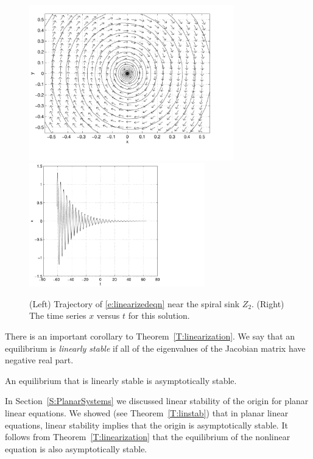 \documentclass{ximera}
\begin{document}
\begin{figure}[htb]
           \centerline{%
	   \includegraphics[width=3.5in]{../figures/spirala.pdf}
           \includegraphics[width=3.0in]{../figures/spiralb.pdf}}
           \caption{(Left) Trajectory of \protect\eqref{e:linearizedeqn} 
	     near the spiral sink $Z_2$. (Right) The time series $x$ 
		versus $t$ for this solution.}
           \label{F:spiral}
\end{figure}


There is an important corollary to Theorem~\ref{T:linearization}.
We say that an equilibrium is 
{\em linearly stable\/}
if all of the eigenvalues of the Jacobian matrix have negative real part.

\begin{corollary} \label{C:linearstability}
An equilibrium that is linearly stable is asymptotically stable.
\end{corollary}   

In Section~\ref{S:PlanarSystems} we discussed linear stability
of the origin for planar linear equations.  We showed (see
Theorem~\ref{T:linstab}) that in planar linear equations, linear
stability implies that the origin is asymptotically stable.  It
follows from Theorem~\ref{T:linearization} that the equilibrium
of the nonlinear equation is also asymptotically stable.  
\end{document}
